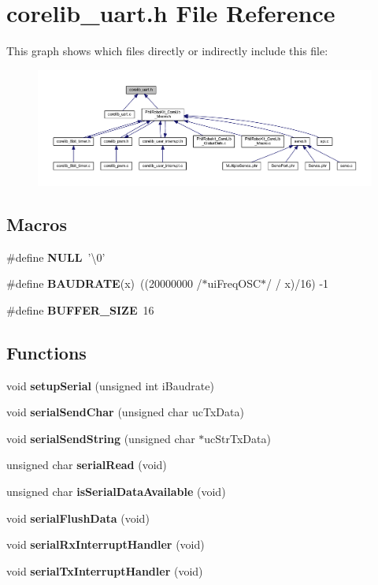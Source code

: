 \section{corelib\-\_\-uart.\-h File Reference}
\label{corelib__uart_8h}
This graph shows which files directly or indirectly include this file\-:\nopagebreak
\begin{figure}[H]
\begin{center}
\leavevmode
\includegraphics[width=350pt]{corelib__uart_8h__dep__incl}
\end{center}
\end{figure}
\subsection*{Macros}
\begin{DoxyCompactItemize}
\item 
\#define {\bf N\-U\-L\-L}~'\textbackslash{}0'
\item 
\#define {\bf B\-A\-U\-D\-R\-A\-T\-E}(x)~((20000000 /$\ast$ui\-Freq\-O\-S\-C$\ast$/ / x)/16) -\/1
\item 
\#define {\bf B\-U\-F\-F\-E\-R\-\_\-\-S\-I\-Z\-E}~16
\end{DoxyCompactItemize}
\subsection*{Functions}
\begin{DoxyCompactItemize}
\item 
void {\bf setup\-Serial} (unsigned int i\-Baudrate)
\item 
void {\bf serial\-Send\-Char} (unsigned char uc\-Tx\-Data)
\item 
void {\bf serial\-Send\-String} (unsigned char $\ast$uc\-Str\-Tx\-Data)
\item 
unsigned char {\bf serial\-Read} (void)
\item 
unsigned char {\bf is\-Serial\-Data\-Available} (void)
\item 
void {\bf serial\-Flush\-Data} (void)
\item 
void {\bf serial\-Rx\-Interrupt\-Handler} (void)
\item 
void {\bf serial\-Tx\-Interrupt\-Handler} (void)
\end{DoxyCompactItemize}
